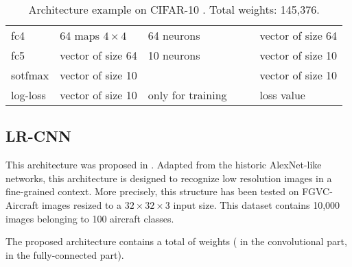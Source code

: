 \begin{table}[h]
\begin{center}
\begin{tabular}{|l||l||l|c|c||l|}
   \hline
   fc4        & 64 maps $4 \times 4$           & 64 neurons                              &        &           & vector of size 64      \\
   fc5        & vector of size 64              & 10 neurons                              &        &           & vector of size 10      \\
   \hline
   sotfmax     & vector of size 10              &                                         &        &         & vector of size 10      \\
   log-loss    & vector of size 10              & only for training                       &        &         & loss value             \\
   \hline
 \end{tabular}
 \caption{Architecture example on CIFAR-10 \cite{CIFAR}. Total weights: 145,376.}
 \label{table:CIFAR}
\end{center}
\end{table} 







\subsection{LR-CNN}

This architecture was proposed in \cite{Chevalier15}. Adapted from the historic AlexNet-like networks, this architecture is designed to recognize 
low resolution images in a fine-grained context. More precisely, this structure has been tested on FGVC-Aircraft images \cite{maji13fine-grained} 
resized to a $32 \times 32 \times 3$ input size. 
This dataset contains 10,000 images belonging to 100 aircraft classes. 

The proposed architecture contains a total of  weights ( in the convolutional part, in the fully-connected part).



